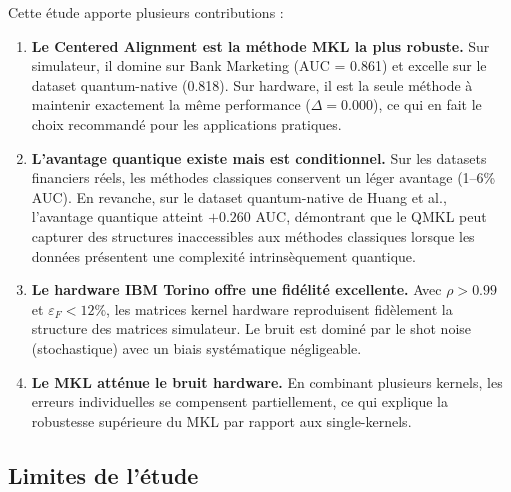 \documentclass[12pt,a4paper]{article}
\begin{document}
Cette étude apporte plusieurs contributions :

\begin{enumerate}
    \item \textbf{Le Centered Alignment est la méthode MKL la plus robuste.} Sur simulateur, il domine sur Bank Marketing (AUC = 0.861) et excelle sur le dataset quantum-native (0.818). Sur hardware, il est la seule méthode à maintenir exactement la même performance ($\Delta = 0.000$), ce qui en fait le choix recommandé pour les applications pratiques.

    \item \textbf{L'avantage quantique existe mais est conditionnel.} Sur les datasets financiers réels, les méthodes classiques conservent un léger avantage (1--6\% AUC). En revanche, sur le dataset quantum-native de Huang et al., l'avantage quantique atteint $+0.260$ AUC, démontrant que le QMKL peut capturer des structures inaccessibles aux méthodes classiques lorsque les données présentent une complexité intrinsèquement quantique.

    \item \textbf{Le hardware IBM Torino offre une fidélité excellente.} Avec $\rho > 0.99$ et $\varepsilon_F < 12\%$, les matrices kernel hardware reproduisent fidèlement la structure des matrices simulateur. Le bruit est dominé par le shot noise (stochastique) avec un biais systématique négligeable.

    \item \textbf{Le MKL atténue le bruit hardware.} En combinant plusieurs kernels, les erreurs individuelles se compensent partiellement, ce qui explique la robustesse supérieure du MKL par rapport aux single-kernels.
\end{enumerate}

\subsection{Limites de l'étude}
\end{document}

